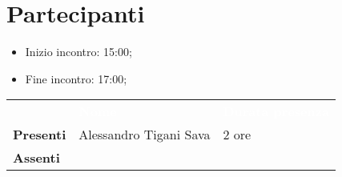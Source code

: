 \section{Partecipanti}

\begin{itemize}
    \item Inizio incontro: 15:00;
    \item Fine incontro: 17:00;
\end{itemize}


\begin{center}
{\renewcommand{\arraystretch}{1.5}
\begin{tabular}{lll}
	\rowcolor[RGB]{33, 73, 50}
	                    & \textcolor{white}{\textbf{Nome}}  & \textcolor{white}{\textbf{Durata presenza}} \\
	\rowcolor[RGB]{216, 235, 171}
	\textbf{Presenti}   & Alessandro Tigani Sava            & 2 ore     \\
	\rowcolor[RGB]{233, 245, 206}
	\textbf{Assenti}	& 	                                &	        \\
\end{tabular}	
}
\end{center}